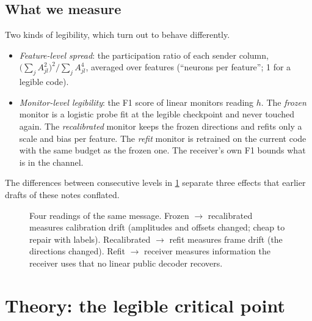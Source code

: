 \subsection{What we measure}
Two kinds of legibility, which turn out to behave differently.
\begin{itemize}[leftmargin=*]
\item \emph{Feature-level spread}: the participation ratio of each sender column, $\big(\sum_jA_{jl}^2\big)^2/\sum_jA_{jl}^4$,
averaged over features (``neurons per feature''; 1 for a legible code).
\item \emph{Monitor-level legibility}: the F1 score of linear monitors reading $h$. The \emph{frozen} monitor is a
logistic probe fit at the legible checkpoint and never touched again. The \emph{recalibrated} monitor keeps the
frozen directions and refits only a scale and bias per feature. The \emph{refit} monitor is retrained on the
current code with the same budget as the frozen one. The receiver's own F1 bounds what is in the channel.
\end{itemize}
The differences between consecutive levels in \cref{fig:ladder} separate three effects that earlier drafts of these
notes conflated.

\begin{figure}[h]
\centering\MonitorLadder
\caption{Four readings of the same message. Frozen $\to$ recalibrated measures calibration drift (amplitudes and
offsets changed; cheap to repair with labels). Recalibrated $\to$ refit measures frame drift (the directions
changed). Refit $\to$ receiver measures information the receiver uses that no linear public decoder recovers.}
\label{fig:ladder}
\end{figure}

\section{Theory: the legible critical point}\label{sec:saddle}

